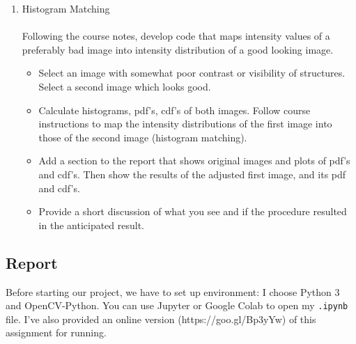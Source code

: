 \documentclass{article}
\begin{document}
\begin{enumerate}[label=B\arabic*)]
	\item Histogram Matching
		\\
		\\
		Following the course notes, develop code that maps intensity values of a preferably bad image into intensity distribution of a good looking image.
		\begin{itemize}
			\item Select an image with somewhat poor contrast or visibility of structures. Select a second image which looks good.
			\item Calculate histograms, pdf's, cdf's of both images. Follow course instructions to map the intensity distributions of the first image into those of the second image (histogram matching).
			\item Add a section to the report that shows original images and plots of pdf's and cdf's. Then show the results of the adjusted first image, and its pdf and cdf's.
			\item Provide a short discussion of what you see and if the procedure resulted in the anticipated result.
		\end{itemize}		
\end{enumerate}

\pagebreak

\subsection{Report}
Before starting our project, we have to set up environment: I choose Python 3 and OpenCV-Python. You can use Jupyter or Google Colab to open my \texttt{.ipynb} file. I've also provided an online version (https://goo.gl/Bp3yYw) of this assignment for running.
\end{document}
